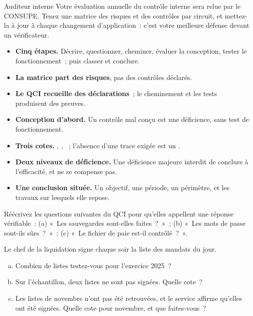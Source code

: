 \begin{boxmetier}{Auditeur interne}
Votre évaluation annuelle du contrôle interne sera relue par le CONSUPE.
Tenez une matrice des risques et des contrôles par circuit, et mettez-la
à jour à chaque changement d'application~: c'est votre meilleure défense
devant un vérificateur.
\end{boxmetier}

\separateur

\begin{boxresume}
\begin{itemize}
    \item \textbf{Cinq étapes.} Décrire, questionner, cheminer, évaluer la
          conception, tester le fonctionnement~; puis classer et conclure.
    \item \textbf{La matrice part des risques}, pas des contrôles déclarés.
    \item \textbf{Le QCI recueille des déclarations}~; le cheminement et les
          tests produisent des preuves.
    \item \textbf{Conception d'abord.} Un contrôle mal conçu est une
          déficience, sans test de fonctionnement.
    \item \textbf{Trois cotes.} \OUI{}, \NON{}, \NEK{}~; l'absence d'une
          trace exigée est un \NON{}.
    \item \textbf{Deux niveaux de déficience.} Une déficience majeure
          interdit de conclure à l'efficacité, et ne se compense pas.
    \item \textbf{Une conclusion située.} Un objectif, une période, un
          périmètre, et les travaux sur lesquels elle repose.
\end{itemize}
\end{boxresume}

\begin{boxexo}[title={\ding{45}\quad Exercice~3.1. Formuler des questions \niveaubase}]
Réécrivez les questions suivantes du QCI pour qu'elles appellent une
réponse vérifiable~: (a) «~Les sauvegardes sont-elles faites~?~»~; (b)
«~Les mots de passe sont-ils sûrs~?~»~; (c) «~Le fichier de paie est-il
contrôlé~?~».
\end{boxexo}

\begin{boxexo}[title={\ding{45}\quad Exercice~3.2. Dimensionner et coter \niveaubase}]
Le chef de la liquidation signe chaque soir la liste des mandats du jour.
\begin{enumerate}[(a)]
    \item Combien de listes testez-vous pour l'exercice 2025~?
    \item Sur l'échantillon, deux listes ne sont pas signées. Quelle
          cote~?
    \item Les listes de novembre n'ont pas été retrouvées, et le service
          affirme qu'elles ont été signées. Quelle cote pour novembre, et
          que faites-vous~?
\end{enumerate}
\end{boxexo}

